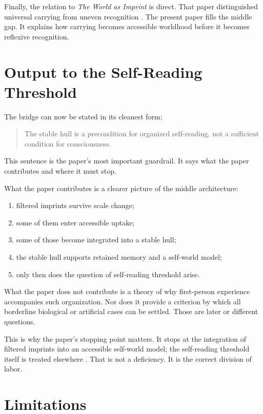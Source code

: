 \documentclass[12pt]{article}
\begin{document}
Finally, the relation to \emph{The World as Imprint} is direct. That paper distinguished universal carrying from uneven recognition \cite{WorldImprint}. The present paper fills the middle gap. It explains how carrying becomes accessible worldhood before it becomes reflexive recognition.

\section{Output to the Self-Reading Threshold}

The bridge can now be stated in its cleanest form:

\begin{quote}
The stable hull is a precondition for organized self-reading, not a sufficient condition for consciousness.
\end{quote}

This sentence is the paper's most important guardrail. It says what the paper contributes and where it must stop.

What the paper contributes is a clearer picture of the middle architecture:

\begin{enumerate}
\item filtered imprints survive scale change;
\item some of them enter accessible uptake;
\item some of those become integrated into a stable hull;
\item the stable hull supports retained memory and a self-world model;
\item only then does the question of self-reading threshold arise.
\end{enumerate}

What the paper does not contribute is a theory of why first-person experience accompanies such organization. Nor does it provide a criterion by which all borderline biological or artificial cases can be settled. Those are later or different questions.

This is why the paper's stopping point matters. It stops at the integration of filtered imprints into an accessible self-world model; the self-reading threshold itself is treated elsewhere \cite{WorldImprint}. That is not a deficiency. It is the correct division of labor.

\section{Limitations}
\end{document}
